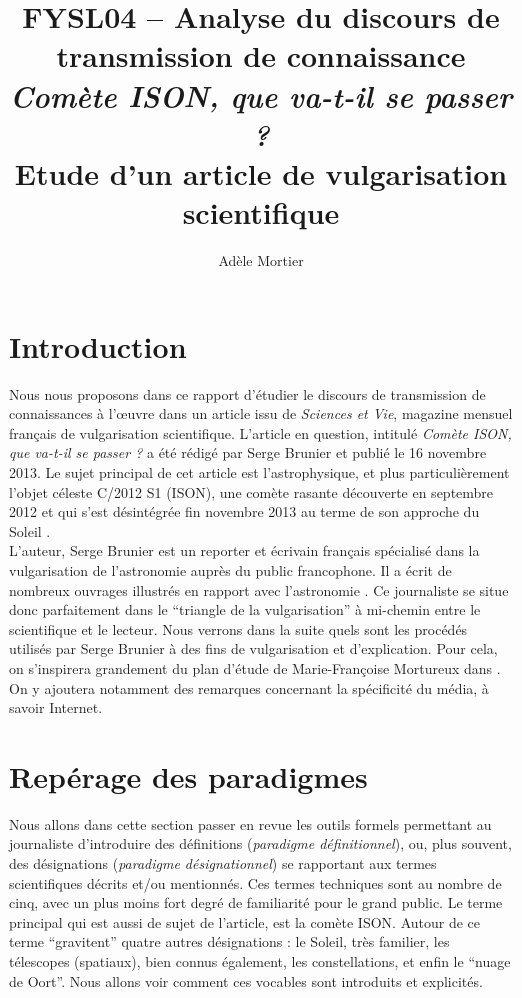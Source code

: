 \documentclass[a4paper,10pt]{article}
\title{FYSL04 -- Analyse du discours de transmission de connaissance\\
	\textit{Comète ISON, que va-t-il se passer ?}\\ \vspace{0.3cm}
	\small Etude d'un article de vulgarisation scientifique}
\author{Adèle Mortier}
\begin{document}
\maketitle
\nocite{*}
\tableofcontents

\section*{Introduction} \label{intro}
	Nous nous proposons dans ce rapport d'étudier le discours de transmission de connaissances à l'œuvre dans un article issu de \textit{Sciences et Vie}, magazine mensuel français de vulgarisation scientifique. L'article en question, intitulé \textit{Comète ISON, que va-t-il se passer ?} a été rédigé par Serge Brunier et publié le 16 novembre 2013. Le sujet principal de cet article est l'astrophysique, et plus particulièrement l'objet céleste C/2012 S1 (ISON), une comète rasante découverte en septembre 2012 et qui s'est désintégrée fin novembre 2013 au terme de son approche du Soleil \cite{ISON}.\\
	L'auteur, Serge Brunier est un reporter et écrivain français spécialisé dans la vulgarisation de l'astronomie auprès du public francophone. Il a écrit de nombreux ouvrages illustrés en rapport avec l'astronomie \cite{SB}. Ce journaliste se situe donc parfaitement dans le ``triangle de la vulgarisation'' à mi-chemin entre le scientifique et le lecteur. Nous verrons dans la suite quels sont les procédés utilisés par Serge Brunier à des fins de vulgarisation et d'explication. Pour cela, on s'inspirera grandement du plan d'étude de Marie-Françoise Mortureux dans \cite{Mortureux1993}. On y ajoutera notamment des remarques concernant la spécificité du média, à savoir Internet.

\section{Repérage des paradigmes} \label{reperage}
	Nous allons dans cette section passer en revue les outils formels permettant au journaliste d'introduire des définitions (\textit{paradigme définitionnel}), ou, plus souvent, des désignations (\textit{paradigme désignationnel}) se rapportant aux termes scientifiques décrits et/ou mentionnés. Ces termes techniques sont au nombre de cinq, avec un plus moins fort degré de familiarité pour le grand public. Le terme principal qui est aussi de sujet de l'article, est la comète ISON. Autour de ce terme ``gravitent'' quatre autres désignations : le Soleil, très familier, les télescopes (spatiaux), bien connus également, les constellations, et enfin le ``nuage de Oort''. Nous allons voir comment ces vocables sont introduits et explicités. 
\end{document}

